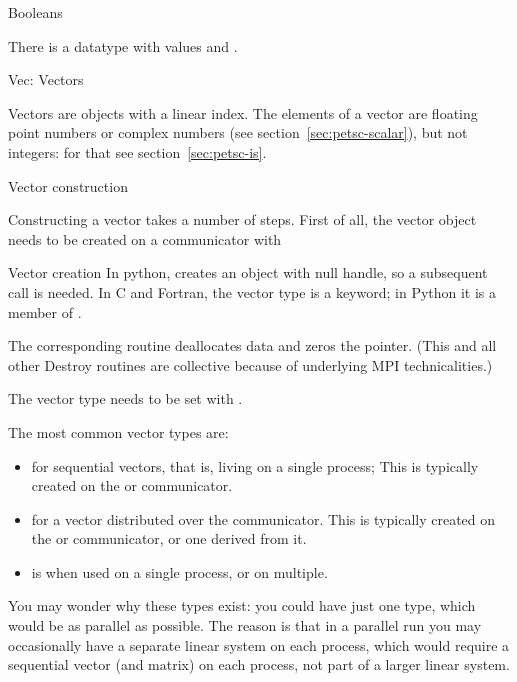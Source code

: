  {Booleans}

There is a  datatype
with values  and .

 {Vec: Vectors}

Vectors are objects with a linear index. The elements of a vector are
floating point numbers or complex numbers (see
section~\ref{sec:petsc-scalar}), but not integers: for that see
section~\ref{sec:petsc-is}.

 {Vector construction}

Constructing a vector takes a number of steps. First of all, the
vector object needs
to be created on a communicator with
%

\begin{pythonnote}{Vector creation}
  In python,  creates an object with null handle, so a
  subsequent  call is needed.
  In C and Fortran, the vector type is a keyword; in Python it is a
  member of .
\end{pythonnote}

The corresponding routine  deallocates data and zeros
the pointer.
(This and all other Destroy routines are collective because of underlying
MPI technicalities.)

The vector type needs to be set with .

The most common vector types are:
\begin{itemize}
\item {} for sequential vectors, that is, living on a single process;
  This is typically created on the  or
   communicator.
\item {} for a vector distributed over the communicator.
  This is typically created on the  or
   communicator, or one derived from it.
\item {} is  when used on a single process,
  or  on multiple.
\end{itemize}

You may wonder why these types exist: you could have just one type,
which would be as parallel as possible.
The reason is that in a parallel run you may occasionally
have a separate linear system on each process, which
would require a sequential vector (and matrix) on each process,
not part of a larger linear system.

